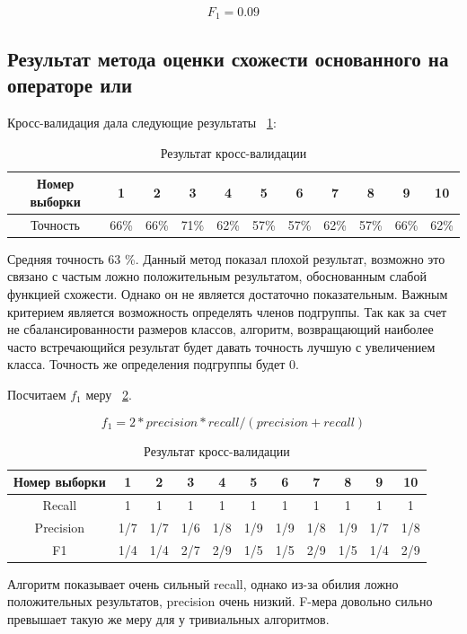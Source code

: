 \documentclass[annotation,times,page4]{itmo-student-thesis}
\begin{document}
\[
    F_{1} = 0.09  
\] 
\subsection{Результат метода оценки схожести основанного на операторе или}

Кросс-валидация дала следующие результаты {~\ref{tab2}}:

\begin{table}[!h]
\caption{Результат кросс-валидации}\label{tab2}
\centering
\begin{tabular}{|*{11}{c|}}\hline
Номер выборки & 1 & 2 & 3 & 4 & 5 & 6 & 7 & 8 & 9 & 10 \\\hline
Точность  & 66\% & 66\% & 71\% & 62\% & 57\% & 57\% & 62\% & 57\% & 66\% & 62\% \\\hline
\end{tabular}
\end{table}

Средняя точность 63 \%. Данный метод показал плохой результат, возможно это связано с частым ложно положительным результатом, обоснованным слабой функцией схожести. Однако он не является достаточно показательным. Важным критерием является возможность определять членов подгруппы. Так как за счет не сбалансированности размеров классов, алгоритм, возвращающий наиболее часто встречающийся результат будет давать точность лучшую с увеличением класса. Точность же определения подгруппы будет 0.


Посчитаем $f_{1}$ меру ~\ref{tab3}.

\[
    f_{1} = 2 * precision * recall / (precision + recall)
\] 

\begin{table}[!h]
\caption{Результат кросс-валидации}\label{tab3}
\centering
\begin{tabular}{|*{11}{c|}}\hline
Номер выборки & 1 & 2 & 3 & 4 & 5 & 6 & 7 & 8 & 9 & 10 \\\hline
Recall  & 1& 1& 1& 1& 1& 1& 1& 1& 1& 1\\\hline
Precision & 1/7 & 1/7& 1/6& 1/8& 1/9& 1/9& 1/8 & 1/9& 1/7& 1/8\\\hline
F1 & 1/4 & 1/4 & 2/7 & 2/9 & 1/5 & 1/5 & 2/9 & 1/5 & 1/4 & 2/9 \\\hline

\end{tabular}
\end{table}

Алгоритм показывает очень сильный recall, однако из-за обилия ложно положительных результатов, precision очень низкий. F-мера довольно сильно превышает такую же меру для у тривиальных алгоритмов.
\end{document}
